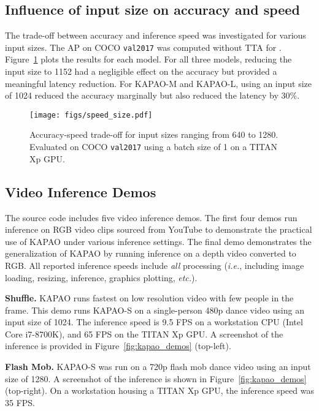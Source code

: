 \documentclass[runningheads]{llncs}
\newcommand{\ie}{\textit{i.e.}}
\newcommand{\etc}{\textit{etc.}}
\begin{document}
\subsection{Influence of input size on accuracy and speed}
The trade-off between accuracy and inference speed was investigated for various input sizes. The AP on COCO \texttt{val2017} was computed without TTA for . Figure~\ref{fig:speed_size} plots the results for each model. For all three models, reducing the input size to 1152 had a negligible effect on the accuracy but provided a meaningful latency reduction. For KAPAO-M and KAPAO-L, using an input size of 1024 reduced the accuracy marginally but also reduced the latency by 30\%.

\begin{figure}[t]
\centering
    \texttt{[image: figs/speed\_size.pdf]}
\caption{Accuracy-speed trade-off for input sizes ranging from 640 to 1280. Evaluated on COCO \texttt{val2017} using a batch size of 1 on a TITAN Xp GPU.}
\label{fig:speed_size}
\end{figure}

\subsection{Video Inference Demos}
The source code includes five video inference demos. The first four demos run inference on RGB video clips sourced from YouTube to demonstrate the practical use of KAPAO under various inference settings. The final demo demonstrates the generalization of KAPAO by running inference on a depth video converted to RGB.  All reported inference speeds include \textit{all} processing (\ie, including image loading, resizing, inference, graphics plotting, \etc).

\medskip\noindent\textbf{Shuffle.} KAPAO runs fastest on low resolution video with few people in the frame. This demo runs KAPAO-S on a single-person 480p dance video using an input size of 1024. The inference speed is 9.5 FPS on a workstation CPU (Intel Core i7-8700K), and 65 FPS on the TITAN Xp GPU. A screenshot of the inference is provided in Figure~\ref{fig:kapao_demos} (top-left).

\medskip\noindent\textbf{Flash Mob.} KAPAO-S was run on a 720p flash mob dance video using an input size of 1280. A screenshot of the inference is shown in Figure~\ref{fig:kapao_demos} (top-right). On a workstation housing a TITAN Xp GPU, the inference speed was 35 FPS.
\end{document}
